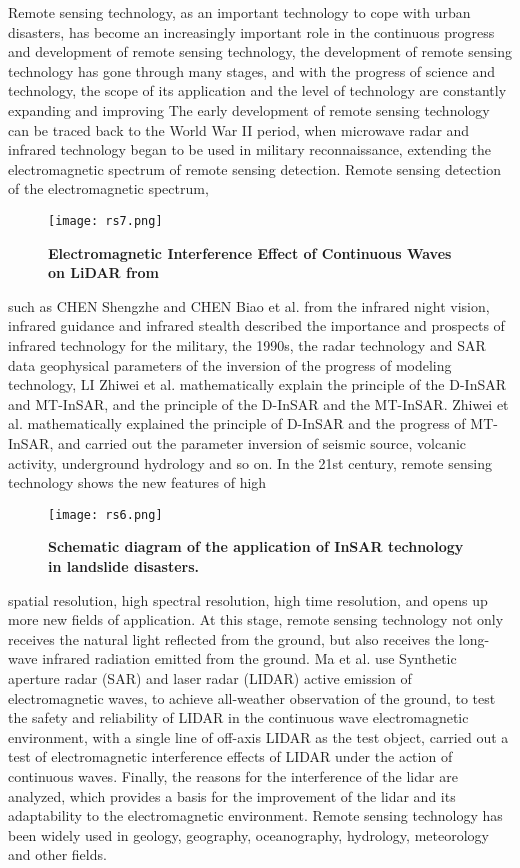 \documentclass[conference]{IEEEtran}
\begin{document}
Remote sensing technology, as an important technology to cope with urban disasters, has become an increasingly important role in the continuous progress and development of remote sensing technology, the development of remote sensing technology has gone through many stages, and with the progress of science and technology, the scope of its application and the level of technology are constantly expanding and improving The early development of remote sensing technology can be traced back to the World War II period, when  microwave radar and infrared technology began to be used in military reconnaissance, extending the electromagnetic spectrum of remote sensing detection\cite{b66}. Remote sensing detection of the electromagnetic spectrum, 
\begin{figure}[h]
    \centering
    \texttt{[image: rs7.png]}
    \caption{\textbf{Electromagnetic Interference Effect of Continuous Waves on LiDAR from\cite{b66}}}
    \label{fig:enter-label}
\end{figure}
 such as CHEN Shengzhe and CHEN Biao et al.\cite{b67} from the infrared night vision, infrared guidance and infrared stealth described the importance and prospects of infrared technology for the military, the 1990s, the radar technology and SAR data geophysical parameters of the inversion of the progress of modeling technology,  LI Zhiwei et al.\cite{b68} mathematically explain the principle of the D-InSAR and MT-InSAR, and the principle of the D-InSAR and the MT-InSAR. Zhiwei et al. mathematically explained the principle of D-InSAR and the progress of MT-InSAR, and carried out the parameter inversion of seismic source, volcanic activity, underground hydrology and so on. In the 21st century, remote sensing technology shows the new features of high 
\begin{figure}[h]
    \centering
    \texttt{[image: rs6.png]}
    \caption{\textbf{Schematic diagram of the application of InSAR technology in landslide disasters.}}
    \label{fig:enter-label}
\end{figure}
spatial resolution, high spectral resolution, high time resolution, and opens up more new fields of application. At this stage, remote sensing technology not only receives the natural light reflected from the ground, but also receives the long-wave infrared radiation emitted from the ground. Ma et al.\cite{b69} use Synthetic aperture radar (SAR) and laser radar (LIDAR) active emission of electromagnetic waves, to achieve all-weather observation of the ground, to test the safety and reliability of LIDAR in the continuous wave electromagnetic environment, with a single line of off-axis LIDAR as the test object, carried out a test of electromagnetic interference effects of LIDAR under the action of continuous waves. Finally, the reasons for the interference of the lidar are analyzed, which provides a basis for the improvement of the lidar and its adaptability to the electromagnetic environment. Remote sensing technology has been widely used in geology, geography, oceanography, hydrology, meteorology and other fields.
\end{document}
